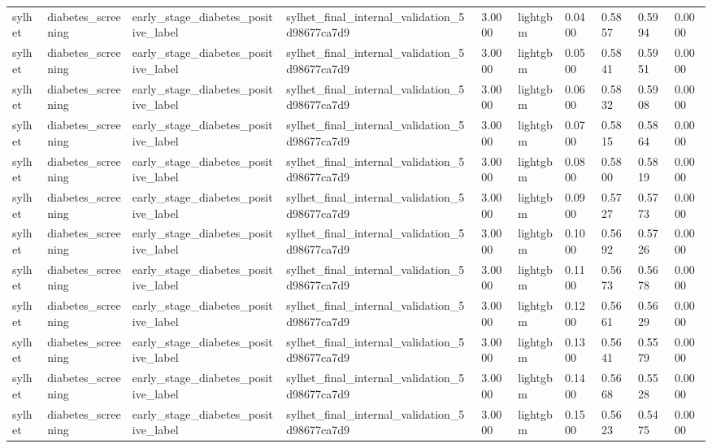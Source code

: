 \begin{tabular}{llllllllll}
sylhet & diabetes\_screening & early\_stage\_diabetes\_positive\_label & sylhet\_final\_internal\_validation\_5d98677ca7d9 & 3.0000 & lightgbm & 0.0400 & 0.5857 & 0.5994 & 0.0000 \\
sylhet & diabetes\_screening & early\_stage\_diabetes\_positive\_label & sylhet\_final\_internal\_validation\_5d98677ca7d9 & 3.0000 & lightgbm & 0.0500 & 0.5841 & 0.5951 & 0.0000 \\
sylhet & diabetes\_screening & early\_stage\_diabetes\_positive\_label & sylhet\_final\_internal\_validation\_5d98677ca7d9 & 3.0000 & lightgbm & 0.0600 & 0.5832 & 0.5908 & 0.0000 \\
sylhet & diabetes\_screening & early\_stage\_diabetes\_positive\_label & sylhet\_final\_internal\_validation\_5d98677ca7d9 & 3.0000 & lightgbm & 0.0700 & 0.5815 & 0.5864 & 0.0000 \\
sylhet & diabetes\_screening & early\_stage\_diabetes\_positive\_label & sylhet\_final\_internal\_validation\_5d98677ca7d9 & 3.0000 & lightgbm & 0.0800 & 0.5800 & 0.5819 & 0.0000 \\
sylhet & diabetes\_screening & early\_stage\_diabetes\_positive\_label & sylhet\_final\_internal\_validation\_5d98677ca7d9 & 3.0000 & lightgbm & 0.0900 & 0.5727 & 0.5773 & 0.0000 \\
sylhet & diabetes\_screening & early\_stage\_diabetes\_positive\_label & sylhet\_final\_internal\_validation\_5d98677ca7d9 & 3.0000 & lightgbm & 0.1000 & 0.5692 & 0.5726 & 0.0000 \\
sylhet & diabetes\_screening & early\_stage\_diabetes\_positive\_label & sylhet\_final\_internal\_validation\_5d98677ca7d9 & 3.0000 & lightgbm & 0.1100 & 0.5673 & 0.5678 & 0.0000 \\
sylhet & diabetes\_screening & early\_stage\_diabetes\_positive\_label & sylhet\_final\_internal\_validation\_5d98677ca7d9 & 3.0000 & lightgbm & 0.1200 & 0.5661 & 0.5629 & 0.0000 \\
sylhet & diabetes\_screening & early\_stage\_diabetes\_positive\_label & sylhet\_final\_internal\_validation\_5d98677ca7d9 & 3.0000 & lightgbm & 0.1300 & 0.5641 & 0.5579 & 0.0000 \\
sylhet & diabetes\_screening & early\_stage\_diabetes\_positive\_label & sylhet\_final\_internal\_validation\_5d98677ca7d9 & 3.0000 & lightgbm & 0.1400 & 0.5668 & 0.5528 & 0.0000 \\
sylhet & diabetes\_screening & early\_stage\_diabetes\_positive\_label & sylhet\_final\_internal\_validation\_5d98677ca7d9 & 3.0000 & lightgbm & 0.1500 & 0.5623 & 0.5475 & 0.0000 \\

\end{tabular}
